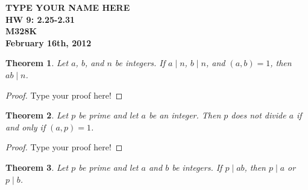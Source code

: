 \documentclass[12pt,leqno]{article}
\numberwithin{equation}{section}
\newtheorem{thm}{Theorem}[section]
\theoremstyle{definition}
\begin{document}
\thispagestyle{plain}
\begin{flushright}
\large{\textbf{TYPE YOUR NAME HERE \\
HW 9: 2.25-2.31\\
M328K \\
February 16th, 2012 \\}}
\end{flushright}

\markboth{}{} \setcounter{section}{0} \baselineskip=18pt

\setcounter{tocdepth}{4}



\setcounter{section}{2}

\setcounter{thm}{24}


\begin{thm}
Let $a$, $b$, and $n$ be integers.  If $a \mid n$, $b \mid n$, and $(a, b) = 1$, then $ab \mid n$.
\end{thm}

\begin{proof}[Proof]
Type your proof here!
\end{proof}



\begin{thm}
Let $p$ be prime and let $a$ be an integer.  Then $p$ does not divide $a$ if and only if $(a, p) = 1$.
\end{thm}

\begin{proof}[Proof]
Type your proof here!
\end{proof}



\begin{thm}
Let $p$ be prime and let $a$ and $b$ be integers. If $p \mid ab$, then $p\mid a$ or $p \mid b$.
\end{thm}
\end{document}
